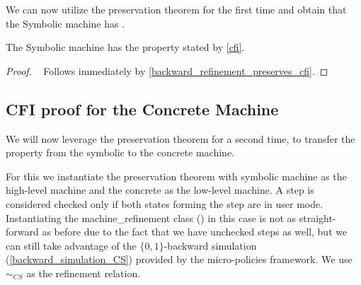 We can now utilize the preservation theorem for the first time and
obtain that the Symbolic machine has \CFI.

\begin{theorem}\label{CFIsymbolic}
The Symbolic machine has the \CFI property stated by \cref{cfi}.
\end{theorem}
\begin{proof}
  ~ Follows immediately by \cref{backward_refinement_preserves_cfi}.
\end{proof}


\subsection{CFI proof for the Concrete Machine}
\label{sec:concrete_proof}

We will now leverage the preservation theorem for a second time,
to transfer the \CFI property from the symbolic to the concrete
machine.

For this we instantiate the preservation theorem with symbolic machine
as the high-level machine and the concrete as the low-level machine. A
step is considered checked only if both states forming the step are in
user mode. Instantiating the machine\_refinement class
() in this case is not as
straight-forward as before due to the fact that we have unchecked
steps as well, but we can still take advantage of the $\lbrace 0,1
\rbrace$-backward simulation (\cref{backward_simulation_CS}) provided
by the micro-policies framework. We use $\sim_{CS}$ as the refinement
relation.

